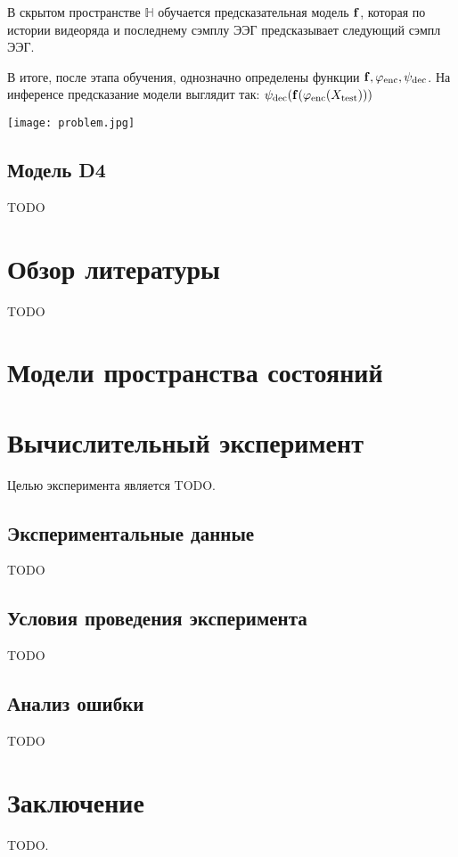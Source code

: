 \documentclass[a4paper, 12pt]{article}
\begin{document}
В скрытом пространстве $\mathds{H}$ обучается предсказательная модель $\mathbf{f}$, которая по истории видеоряда и последнему сэмплу ЭЭГ предсказывает следующий сэмпл ЭЭГ.

В итоге, после этапа обучения, однозначно определены функции $\mathbf{f}, \varphi_{\text{enc}}, \psi_{\text{dec}}$.
На инференсе предсказание модели выглядит так: $\psi_{\text{dec}}(\mathbf{f}(\varphi_{\text{enc}}(X_{\text{test}})))$

\texttt{[image: problem.jpg]}

\subsection{Модель D4}
TODO

\section{Обзор литературы}
TODO

\section{Модели пространства состояний}

\section{Вычислительный эксперимент}
Целью эксперимента является TODO.

\subsection{Экспериментальные данные}
TODO

\subsection{Условия проведения эксперимента}
TODO

\subsection{Анализ ошибки}
TODO


\section{Заключение}
TODO.



\end{document}
